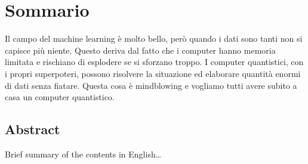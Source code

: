 \begingroup
\let\clearpage\relax
\let\cleardoublepage\relax
\let\cleardoublepage\relax

\chapter*{Sommario}
Il campo del machine learning è molto bello, però quando i dati sono tanti non si capisce più niente. 
Questo deriva dal fatto che i computer hanno memoria limitata e rischiano di esplodere se 
si sforzano troppo. 
I computer quantistici, con i propri superpoteri, possono risolvere la situazione ed elaborare 
quantità enormi di dati senza fiatare. 
Questa cosa è mindblowing e vogliamo tutti avere subito a casa un computer quantistico. 

\vfill

\begin{otherlanguage}{english}
\chapter*{Abstract}
Brief summary of the contents in English\dots
\end{otherlanguage}

\endgroup

\vfill
